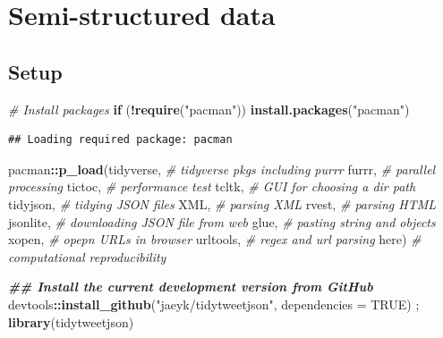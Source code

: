 \documentclass[
]{book}
\newenvironment{Shaded}{\begin{snugshade}}{\end{snugshade}}
\newcommand{\AttributeTok}[1]{\textcolor[rgb]{0.13,0.29,0.53}{#1}}
\newcommand{\CommentTok}[1]{\textcolor[rgb]{0.56,0.35,0.01}{\textit{#1}}}
\newcommand{\ConstantTok}[1]{\textcolor[rgb]{0.56,0.35,0.01}{#1}}
\newcommand{\ControlFlowTok}[1]{\textcolor[rgb]{0.13,0.29,0.53}{\textbf{#1}}}
\newcommand{\DocumentationTok}[1]{\textcolor[rgb]{0.56,0.35,0.01}{\textbf{\textit{#1}}}}
\newcommand{\FunctionTok}[1]{\textcolor[rgb]{0.13,0.29,0.53}{\textbf{#1}}}
\newcommand{\NormalTok}[1]{#1}
\newcommand{\SpecialCharTok}[1]{\textcolor[rgb]{0.81,0.36,0.00}{\textbf{#1}}}
\newcommand{\StringTok}[1]{\textcolor[rgb]{0.31,0.60,0.02}{#1}}
\begin{document}
\chapter{Semi-structured data}\label{semi_structured_data}

\section{Setup}\label{setup-4}

\begin{Shaded}
\begin{Highlighting}[]
\CommentTok{\# Install packages }
\ControlFlowTok{if}\NormalTok{ (}\SpecialCharTok{!}\FunctionTok{require}\NormalTok{(}\StringTok{"pacman"}\NormalTok{)) }\FunctionTok{install.packages}\NormalTok{(}\StringTok{"pacman"}\NormalTok{)}
\end{Highlighting}
\end{Shaded}

\begin{verbatim}
## Loading required package: pacman
\end{verbatim}

\begin{Shaded}
\begin{Highlighting}[]
\NormalTok{pacman}\SpecialCharTok{::}\FunctionTok{p\_load}\NormalTok{(tidyverse, }\CommentTok{\# tidyverse pkgs including purrr}
\NormalTok{               furrr, }\CommentTok{\# parallel processing }
\NormalTok{               tictoc, }\CommentTok{\# performance test  }
\NormalTok{               tcltk, }\CommentTok{\# GUI for choosing a dir path }
\NormalTok{               tidyjson, }\CommentTok{\# tidying JSON files }
\NormalTok{               XML, }\CommentTok{\# parsing XML}
\NormalTok{               rvest, }\CommentTok{\# parsing HTML}
\NormalTok{               jsonlite, }\CommentTok{\# downloading JSON file from web}
\NormalTok{               glue, }\CommentTok{\# pasting string and objects}
\NormalTok{               xopen, }\CommentTok{\# opepn URLs in browser }
\NormalTok{               urltools, }\CommentTok{\# regex and url parsing }
\NormalTok{               here) }\CommentTok{\# computational reproducibility}

\DocumentationTok{\#\# Install the current development version from GitHub}
\NormalTok{devtools}\SpecialCharTok{::}\FunctionTok{install\_github}\NormalTok{(}\StringTok{"jaeyk/tidytweetjson"}\NormalTok{, }\AttributeTok{dependencies =} \ConstantTok{TRUE}\NormalTok{) ; }\FunctionTok{library}\NormalTok{(tidytweetjson)}
\end{Highlighting}
\end{Shaded}
\end{document}

